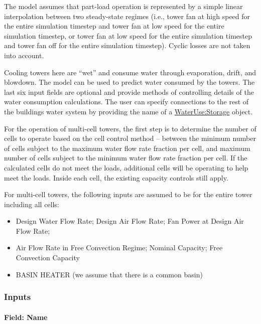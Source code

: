 The model assumes that part-load operation is represented by a simple linear interpolation between two steady-state regimes (i.e., tower fan at high speed for the entire simulation timestep and tower fan at low speed for the entire simulation timestep, or tower fan at low speed for the entire simulation timestep and tower fan off for the entire simulation timestep). Cyclic losses are not taken into account.

Cooling towers here are ``wet'' and consume water through evaporation, drift, and blowdown. The model can be used to predict water consumed by the towers. The last six input fields are optional and provide methods of controlling details of the water consumption calculations. The user can specify connections to the rest of the buildings water system by providing the name of a \hyperref[waterusestorage]{WaterUse:Storage} object.

For the operation of multi-cell towers, the first step is to determine the number of cells to operate based on the cell control method -- between the minimum number of cells subject to the maximum water flow rate fraction per cell, and maximum number of cells subject to the minimum water flow rate fraction per cell. If the calculated cells do not meet the loads, additional cells will be operating to help meet the loads. Inside each cell, the existing capacity controls still apply.

For multi-cell towers, the following inputs are assumed to be for the entire tower including all cells:

\begin{itemize}
\item
  Design Water Flow Rate; Design Air Flow Rate; Fan Power at Design Air Flow Rate;
\item
  Air Flow Rate in Free Convection Regime; Nominal Capacity; Free Convection Capacity
\item
  BASIN HEATER (we assume that there is a common basin)
\end{itemize}

\subsubsection{Inputs}\label{inputs-1-006}

\paragraph{Field: Name}\label{ct-twospeed-field-name}


